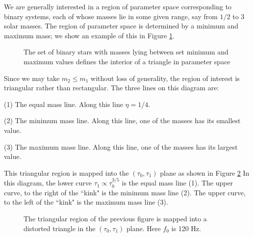 We are generally interested in a region of parameter space
corresponding to binary systems, each of whose masses lie in some given
range, say from $1/2$ to $3$ solar masses.  The region of parameter
space is determined by a minimum and maximum mass; we show an example
of this in Figure \ref{f:massrange}.
\begin{figure}[hb]
\begin{center}
\caption{\label{f:massrange} The set of binary stars with masses lying
between set minimum and maximum values defines the interior of a
triangle in parameter space}
\end{center}
\end{figure}
Since we may take $m_2 \le m_1$ without loss of generality, the region
of interest is triangular rather than rectangular.  The three
lines on this diagram are:
\begin{description}
\item{(1)} The equal mass line.  Along this line $\eta=1/4$.
\item{(2)} The minimum mass line.  Along this line, one of the masses has its smallest value.
\item{(3)} The maximum mass line.  Along this line, one of the masses has its largest value.
\end{description}
This triangular region is mapped into the $(\tau_0,\tau_1)$ plane as
shown in Figure \ref{f:taurange}
In this diagram, the lower curve $\tau_1 \propto \tau_0^{3/5}$ is the
equal mass line (1).  The upper curve, to the right of the ``kink" is
the minimum mass line (2).  The upper curve, to the left of the
``kink" is the maximum mass line (3).
\begin{figure}[hb]
\begin{center}
\caption{\label{f:taurange} The triangular region of the previous
figure is mapped into a distorted triangle in the $(\tau_0,\tau_1)$
plane.  Here $f_0$ is 120 Hz.}
\end{center}
\end{figure}

\clearpage
